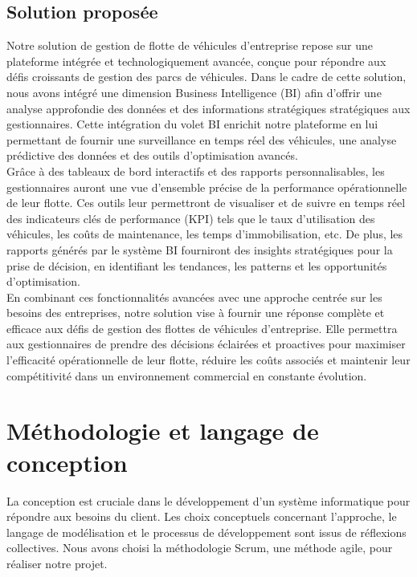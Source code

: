 
\subsection{ Solution proposée}
\bigskip
Notre solution de gestion de flotte de véhicules d’entreprise repose sur une plateforme intégrée et technologiquement avancée, conçue pour répondre aux défis croissants de gestion des parcs de véhicules. Dans le cadre de cette solution, nous avons intégré une dimension Business Intelligence (BI) afin d'offrir une analyse approfondie des données et des informations stratégiques stratégiques aux gestionnaires. Cette intégration du volet BI enrichit notre plateforme en lui permettant de fournir une surveillance en temps réel des véhicules, une analyse prédictive des données et des outils d'optimisation avancés.\\

Grâce à des tableaux de bord interactifs et des rapports personnalisables, les gestionnaires auront une vue d'ensemble précise de la performance opérationnelle de leur flotte. Ces outils leur permettront de visualiser et de suivre en temps réel des indicateurs clés de performance (KPI) tels que le taux d'utilisation des véhicules, les coûts de maintenance, les temps d'immobilisation, etc. De plus, les rapports générés par le système BI fourniront des insights stratégiques pour la prise de décision, en identifiant les tendances, les patterns et les opportunités d'optimisation.\\

En combinant ces fonctionnalités avancées avec une approche centrée sur les besoins des entreprises, notre solution vise à fournir une réponse complète et efficace aux défis de gestion des flottes de véhicules d’entreprise. Elle permettra aux gestionnaires de prendre des décisions éclairées et proactives pour maximiser l'efficacité opérationnelle de leur flotte, réduire les coûts associés et maintenir leur compétitivité dans un environnement commercial en constante évolution.\\





   
\section{Méthodologie et langage de conception}
La conception est cruciale dans le développement d'un système informatique pour répondre aux besoins du client. Les choix conceptuels concernant l'approche, le langage de modélisation et le processus de développement sont issus de réflexions collectives. Nous avons choisi la méthodologie Scrum, une méthode agile, pour réaliser notre projet.
